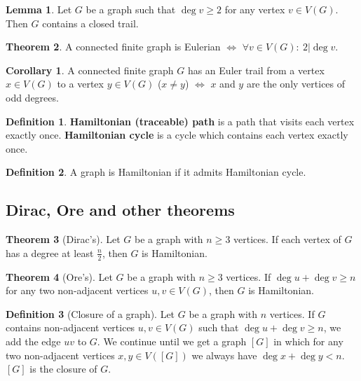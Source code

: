 \documentclass{article}
\theoremstyle{definition}
\newtheorem{theorem}{Theorem}[section]
\newtheorem{corollary}{Corollary}[section]
\newtheorem{lemma}[theorem]{Lemma}
\newtheorem{dd}{Definition}[section]
\begin{document}
\begin{lemma}
    Let $G$ be a graph such that $\deg v \geq 2$ for any vertex $v \in V(G)$. Then $G$ contains a closed trail.
\end{lemma}

\begin{theorem}
    A connected finite graph is Eulerian $\iff$ $\forall v \in V(G):\ 2|\deg v$.
\end{theorem}

\begin{corollary}
    A connected finite graph $G$ has an Euler trail from a vertex $x \in V(G)$ to a vertex $y \in V(G)$ ($x \neq y$) $\iff$ $x$ and $y$ are the only vertices of odd degrees. 
\end{corollary}

\begin{dd}
    \textbf{Hamiltonian (traceable) path} is a path that visits each vertex exactly once. \textbf{Hamiltonian cycle} is a cycle which contains each vertex exactly once.
\end{dd}

\begin{dd}
    A graph is Hamiltonian if it admits Hamiltonian cycle.
\end{dd}

\subsection{Dirac, Ore and other theorems}

\begin{theorem}[Dirac's]
    Let $G$ be a graph with $n \geq 3$ vertices. If each vertex of $G$ has a degree at least $\frac{n}{2}$, then $G$ is Hamiltonian.
\end{theorem}

\begin{theorem}[Ore's]
    Let $G$ be a graph with $n \geq 3$ vertices. If $\deg u + \deg v \geq n$ for any two non-adjacent vertices $u, v \in V(G)$, then $G$ is Hamiltonian.
\end{theorem}

\begin{dd}[Closure of a graph]
    Let $G$ be a graph with $n$ vertices. If $G$ contains non-adjacent vertices $u, v \in V(G)$ such that $\deg u + \deg v \geq n$, we add the edge $uv$ to $G$. We continue until we get a graph $[G]$ in which for any two non-adjacent vertices $x, y \in V([G])$ we always have $\deg x + \deg y < n$. $[G]$ is the closure of $G$.
\end{dd}
\end{document}
